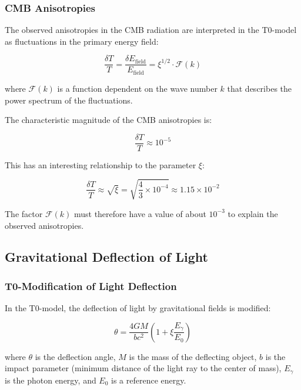 \documentclass[12pt,a4paper]{article}
\theoremstyle{definition}
\begin{document}
	\subsubsection{CMB Anisotropies}
	
	The observed anisotropies in the CMB radiation are interpreted in the T0-model as fluctuations in the primary energy field:
	
	\begin{equation}
		\frac{\delta T}{T} = \frac{\delta E_{\text{field}}}{E_{\text{field}}} = \xi^{1/2} \cdot \mathcal{F}(k)
	\end{equation}
	
	where $\mathcal{F}(k)$ is a function dependent on the wave number $k$ that describes the power spectrum of the fluctuations.
	
	The characteristic magnitude of the CMB anisotropies is:
	
	\begin{equation}
		\frac{\delta T}{T} \approx 10^{-5}
	\end{equation}
	
	This has an interesting relationship to the parameter $\xi$:
	
	\begin{equation}
		\frac{\delta T}{T} \approx \sqrt{\xi} = \sqrt{\frac{4}{3} \times 10^{-4}} \approx 1.15 \times 10^{-2}
	\end{equation}
	
	The factor $\mathcal{F}(k)$ must therefore have a value of about $10^{-3}$ to explain the observed anisotropies.
	
	\subsection{Gravitational Deflection of Light}
	
	\subsubsection{T0-Modification of Light Deflection}
	
	In the T0-model, the deflection of light by gravitational fields is modified:
	
	\begin{equation}
		\boxed{\theta = \frac{4GM}{bc^2}\left(1 + \xi \frac{E_\gamma}{E_0}\right)}
	\end{equation}
	
	where $\theta$ is the deflection angle, $M$ is the mass of the deflecting object, $b$ is the impact parameter (minimum distance of the light ray to the center of mass), $E_\gamma$ is the photon energy, and $E_0$ is a reference energy.
	
\end{document}
